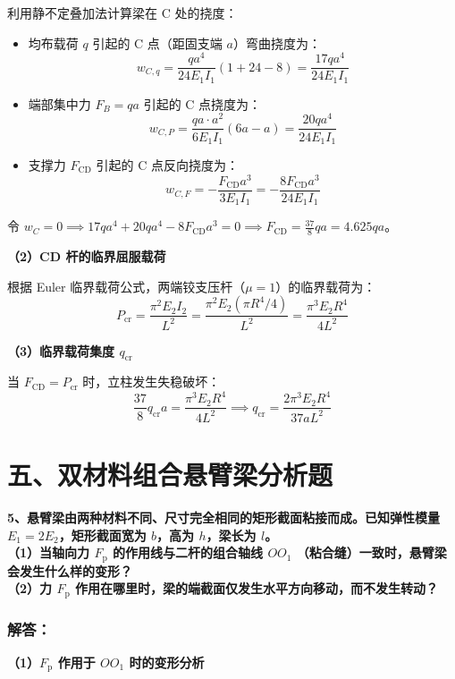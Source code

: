 \documentclass[UTF8,fontset=windows]{ctexart}
\begin{document}
利用静不定叠加法计算梁在 C 处的挠度：
\begin{itemize}
    \item 均布载荷 $q$ 引起的 C 点（距固支端 $a$）弯曲挠度为：
    \[
        w_{C, q} = \frac{q a^4}{24 E_1 I_1} \left( 1 + 24 - 8 \right) = \frac{17 q a^4}{24 E_1 I_1}
    \]
    \item 端部集中力 $F_B = qa$ 引起的 C 点挠度为：
    \[
        w_{C, P} = \frac{qa \cdot a^2}{6 E_1 I_1}(6a - a) = \frac{20 q a^4}{24 E_1 I_1}
    \]
    \item 支撑力 $F_{\text{CD}}$ 引起的 C 点反向挠度为：
    \[
        w_{C, F} = -\frac{F_{\text{CD}} a^3}{3 E_1 I_1} = -\frac{8 F_{\text{CD}} a^3}{24 E_1 I_1}
    \]
\end{itemize}
令 $w_C = 0 \implies 17qa^4 + 20qa^4 - 8 F_{\text{CD}} a^3 = 0 \implies F_{\text{CD}} = \frac{37}{8}qa = 4.625 qa$。

\textbf{（2）CD 杆的临界屈服载荷}

根据 Euler 临界载荷公式，两端铰支压杆（$\mu=1$）的临界载荷为：
\[
    P_{\text{cr}} = \frac{\pi^2 E_2 I_2}{L^2} = \frac{\pi^2 E_2 (\pi R^4 / 4)}{L^2} = \frac{\pi^3 E_2 R^4}{4 L^2}
\]

\textbf{（3）临界载荷集度 $q_{\text{cr}}$}

当 $F_{\text{CD}} = P_{\text{cr}}$ 时，立柱发生失稳破坏：
\[
    \frac{37}{8} q_{\text{cr}} a = \frac{\pi^3 E_2 R^4}{4 L^2} \implies q_{\text{cr}} = \frac{2 \pi^3 E_2 R^4}{37 a L^2}
\]

\newpage

\section*{五、双材料组合悬臂梁分析题}

\textbf{5、悬臂梁由两种材料不同、尺寸完全相同的矩形截面粘接而成。已知弹性模量 $E_1=2E_2$，矩形截面宽为 $b$，高为 $h$，梁长为 $l$。}\\
\textbf{（1）当轴向力 $F_{\text{p}}$ 的作用线与二杆的组合轴线 $OO_1$ （粘合缝）一致时，悬臂梁会发生什么样的变形？}\\
\textbf{（2）力 $F_{\text{p}}$ 作用在哪里时，梁的端截面仅发生水平方向移动，而不发生转动？}

\subsubsection*{解答：}

\textbf{（1）$F_{\text{p}}$ 作用于 $OO_1$ 时的变形分析}
\end{document}
